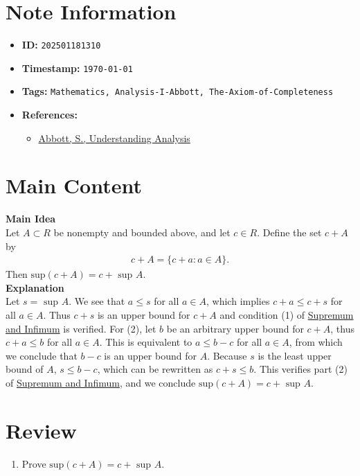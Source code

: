 \clearpage
{}
\label{202501181310}
\renewcommand{\notetitle}{sup(c + A) = c + sup A}

\section*{Note Information}
\begin{itemize}
  \item \textbf{ID:} \texttt{202501181310}
  \item \textbf{Timestamp:} \texttt{\today \ \currenttime}
  \item \textbf{Tags:} \texttt{Mathematics, Analysis-I-Abbott, The-Axiom-of-Completeness}
  \item \textbf{References:}
    \begin{itemize}
      \item \href{/home/garrett/Personal/References/Mathematics/Analysis-I/Abbott.pdf}{Abbott, S., Understanding Analysis}
    \end{itemize}
\end{itemize}


\section*{Main Content}
\textbf{Main Idea}\\
Let $A \subset R$ be nonempty and bounded above, and let $c \in R$. Define the set $c + A$ by 
\begin{align*}
  c + A = \{ c + a : a \in A \}.
\end{align*}
Then $\text{sup}(c + A) = c + \text{ sup } A$.\\

\textbf{Explanation}\\
Let $s = \text{ sup } A$. We see that $a \leq s$ for all $a \in A$, which implies $c + a \leq c + s$ for all $a \in A$. Thus $c + s$ is an upper bound for $c + A$ and condition (1) of \hyperref[202501180743]{Supremum and Infimum} is verified. For (2), let $b$ be an arbitrary upper bound for $c + A$, thus $c + a \leq b$ for all $a \in A$. This is equivalent to $a \leq b - c$ for all $a \in A$, from which we conclude that $b - c$ is an upper bound for $A$. Because $s$ is the least upper bound of $A$, $s \leq b - c$, which can be rewritten as $c + s \leq b$. This verifies part (2) of \hyperref[202501180743]{Supremum and Infimum}, and we conclude $\text{sup}(c + A) = c + \text{ sup } A$.\\


\section*{Review}
\begin{enumerate}
  \item Prove $\text{sup}(c + A) = c + \text{ sup } A$.
\end{enumerate}


